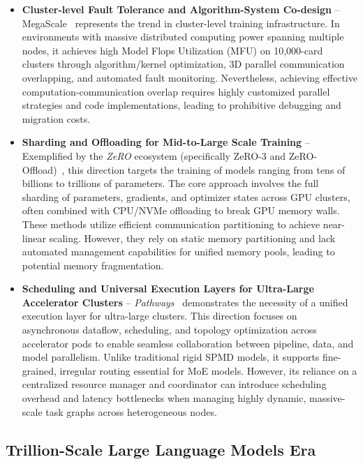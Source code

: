 \documentclass[11pt]{article}
\begin{document}
\begin{itemize}
    \item \textbf{Cluster-level Fault Tolerance and Algorithm-System Co-design} -- {MegaScale}~\cite{jiang2024megascale} represents the trend in cluster-level training infrastructure. In environments with massive distributed computing power spanning multiple nodes, it achieves high Model Flops Utilization (MFU) on 10,000-card clusters through algorithm/kernel optimization, 3D parallel communication overlapping, and automated fault monitoring. Nevertheless, achieving effective computation-communication overlap requires highly customized parallel strategies and code implementations, leading to prohibitive debugging and migration costs.
    
    \item \textbf{Sharding and Offloading for Mid-to-Large Scale Training} -- Exemplified by the \textit{ZeRO} ecosystem (specifically ZeRO-3 and ZeRO-Offload)~\cite{rajbhandari2020zero, ren2021zero}, this direction targets the training of models ranging from tens of billions to trillions of parameters. The core approach involves the full sharding of parameters, gradients, and optimizer states across GPU clusters, often combined with CPU/NVMe offloading to break GPU memory walls. These methods utilize efficient communication partitioning to achieve near-linear scaling. However, they rely on static memory partitioning and lack automated management capabilities for unified memory pools, leading to potential memory fragmentation.

    \item \textbf{Scheduling and Universal Execution Layers for Ultra-Large Accelerator Clusters} -- \textit{Pathways}~\cite{barham2022pathways} demonstrates the necessity of a unified execution layer for ultra-large clusters. This direction focuses on asynchronous dataflow, scheduling, and topology optimization across accelerator pods to enable seamless collaboration between pipeline, data, and model parallelism. Unlike traditional rigid SPMD models, it supports fine-grained, irregular routing essential for MoE models. However, its reliance on a centralized resource manager and coordinator can introduce scheduling overhead and latency bottlenecks when managing highly dynamic, massive-scale task graphs across heterogeneous nodes.
    
\end{itemize}

\subsection{Trillion-Scale Large Language Models Era}
\end{document}
